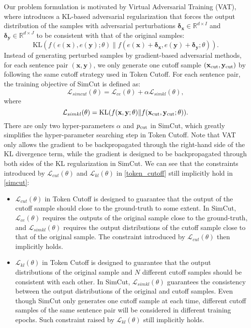 \documentclass[11pt]{article}
\begin{document}
Our problem formulation is motivated by Virtual Adversarial Training (VAT), where \citet{sano2019effective} introduces a KL-based adversarial regularization that forces the output distribution of the samples with adversarial perturbations $\boldsymbol \delta_{\mathbf{x}} \in \mathbb{R}^{d \times I}$ and $\boldsymbol \delta_{\mathbf{y}} \in \mathbb{R}^{d \times J}$ to be consistent with that of the original samples:
\begin{equation*}
\text{KL} (f(e(\mathbf{x}), e(\mathbf{y});\theta) \| f(e(\mathbf{x}) + \boldsymbol \delta_{\mathbf{x}}, e(\mathbf{y}) + \boldsymbol \delta_{\mathbf{y}}; \theta)).
\end{equation*}
Instead of generating perturbed samples by gradient-based adversarial methods, for each sentence pair $( \mathbf{x}, \mathbf{y} )$, we only generate one cutoff sample $( \mathbf{x}_{\rm cut}, \mathbf{y}_{\rm cut} )$ by following the same cutoff strategy used in Token Cutoff. For each sentence pair, the training objective of SimCut is defined as:
\begin{equation}\label{simcut}
\mathcal{L}_{simcut}(\theta) = \mathcal{L}_{ce}(\theta) + \alpha \mathcal{L}_{simkl}(\theta),
\end{equation}
where
\begin{equation*}
\mathcal{L}_{simkl}(\theta) = \text{KL}(f(\mathbf{x}, \mathbf{y}; \theta) \| f(\mathbf{x}_{\rm cut}, \mathbf{y}_{\rm cut}; \theta)).
\end{equation*}
There are only two hyper-parameters $\alpha$ and $p_{\rm cut}$ in SimCut, which greatly simplifies the hyper-parameter searching step in Token Cutoff. Note that VAT only allows the gradient to be backpropagated through the right-hand side of the KL divergence term, while the gradient is designed to be backpropagated through both sides of the KL regularization in SimCut. We can see that the constraints introduced by $\mathcal{L}_{cut}(\theta)$ and $\mathcal{L}_{kl}(\theta)$ in \eqref{token_cutoff} still implicitly hold in \eqref{simcut}:
\begin{itemize}
\item $\mathcal{L}_{cut}(\theta)$ in Token Cutoff is designed to guarantee that the output of the cutoff sample should close to the ground-truth to some extent. In SimCut, $\mathcal{L}_{ce}(\theta)$ requires the outputs of the original sample close to the ground-truth, and $\mathcal{L}_{simkl}(\theta)$ requires the output distributions of the cutoff sample close to that of the original sample. The constraint introduced by $\mathcal{L}_{cut}(\theta)$ then implicitly holds.
\item $\mathcal{L}_{kl}(\theta)$ in Token Cutoff is designed to guarantee that the output distributions of the original sample and $N$ different cutoff samples should be consistent with each other. In SimCut, $\mathcal{L}_{simkl}(\theta)$ guarantees the consistency between the output distributions of the original and cutoff samples. Even though SimCut only generates one cutoff sample at each time, different cutoff samples of the same sentence pair will be considered in different training epochs. Such constraint raised by $\mathcal{L}_{kl}(\theta)$ still implicitly holds.
\end{itemize}
\end{document}
